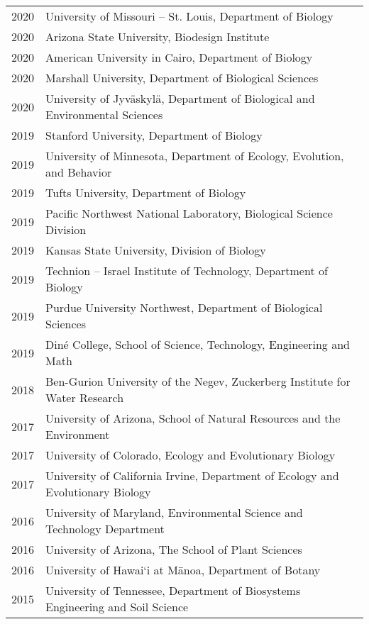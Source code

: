 \documentclass[11pt]{article}
\begin{document}
\begin{longtable}{@{}p{4em}@{\hspace{2em}}p{}@{}}
2020 & University of Missouri – St. Louis, Department of Biology \\
2020 & Arizona State University, Biodesign Institute \\
2020 & American University in Cairo, Department of Biology \\
2020 & Marshall University, Department of Biological Sciences \\
2020 & University of Jyväskylä, Department of Biological and Environmental Sciences \\
2019 & Stanford University, Department of Biology \\
2019 & University of Minnesota, Department of Ecology, Evolution, and Behavior \\
2019 & Tufts University, Department of Biology \\
2019 & Pacific Northwest National Laboratory, Biological Science Division \\
2019 & Kansas State University, Division of Biology \\
2019 & Technion – Israel Institute of Technology, Department of Biology \\
2019 & Purdue University Northwest, Department of Biological Sciences \\
2019 & Diné College, School of Science, Technology, Engineering and Math \\
2018 & Ben-Gurion University of the Negev, Zuckerberg Institute for Water Research \\
2017 & University of Arizona, School of Natural Resources and the Environment \\
2017 & University of Colorado, Ecology and Evolutionary Biology \\
2017 & University of California Irvine, Department of Ecology and Evolutionary Biology \\
2016 & University of Maryland, Environmental Science and Technology Department \\
2016 & University of Arizona, The School of Plant Sciences \\
2016 & University of Hawai‘i at Mānoa, Department of Botany \\
2015 & University of Tennessee, Department of Biosystems Engineering and Soil Science \\
\end{longtable}
\end{document}
